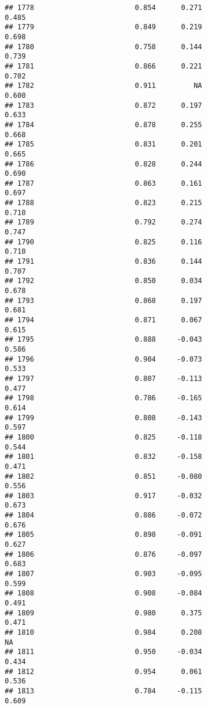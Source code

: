 \documentclass[
]{article}
\begin{document}
\begin{verbatim}
## 1778                        0.854      0.271                     0.485
## 1779                        0.849      0.219                     0.698
## 1780                        0.758      0.144                     0.739
## 1781                        0.866      0.221                     0.702
## 1782                        0.911         NA                     0.600
## 1783                        0.872      0.197                     0.633
## 1784                        0.878      0.255                     0.668
## 1785                        0.831      0.201                     0.665
## 1786                        0.828      0.244                     0.690
## 1787                        0.863      0.161                     0.697
## 1788                        0.823      0.215                     0.710
## 1789                        0.792      0.274                     0.747
## 1790                        0.825      0.116                     0.710
## 1791                        0.836      0.144                     0.707
## 1792                        0.850      0.034                     0.678
## 1793                        0.868      0.197                     0.681
## 1794                        0.871      0.067                     0.615
## 1795                        0.888     -0.043                     0.586
## 1796                        0.904     -0.073                     0.533
## 1797                        0.807     -0.113                     0.477
## 1798                        0.786     -0.165                     0.614
## 1799                        0.808     -0.143                     0.597
## 1800                        0.825     -0.118                     0.544
## 1801                        0.832     -0.158                     0.471
## 1802                        0.851     -0.080                     0.556
## 1803                        0.917     -0.032                     0.673
## 1804                        0.886     -0.072                     0.676
## 1805                        0.898     -0.091                     0.627
## 1806                        0.876     -0.097                     0.683
## 1807                        0.903     -0.095                     0.599
## 1808                        0.908     -0.084                     0.491
## 1809                        0.980      0.375                     0.471
## 1810                        0.984      0.208                        NA
## 1811                        0.950     -0.034                     0.434
## 1812                        0.954      0.061                     0.536
## 1813                        0.784     -0.115                     0.609

\end{verbatim}
\end{document}
